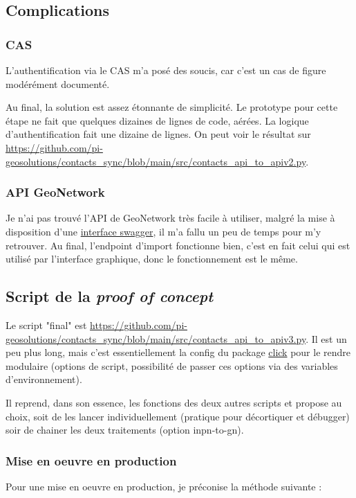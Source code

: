 \documentclass[11pt, a4paper, oneside]{book}
\newcommand{\gn}{GeoNetwork\xspace}
\begin{document}
\subsection*{Complications}
\subsubsection*{CAS}
L'authentification via le CAS m'a posé des soucis, car c'est un cas de figure modérément documenté.

Au final, la solution est assez étonnante de simplicité. Le prototype pour cette étape ne fait que quelques dizaines de lignes de code, aérées. La logique d'authentification fait une dizaine de lignes. On peut voir le résultat sur \url{https://github.com/pi-geosolutions/contacts_sync/blob/main/src/contacts_api_to_apiv2.py}.

\subsubsection*{API \gn}
Je n'ai pas trouvé l'API de \gn très facile à utiliser, malgré la mise à disposition d'une \href{https://sib1.dev.pigeosolutions.fr/geonetwork/doc/api/index.html#/}{interface swagger}, il m'a fallu un peu de temps pour m'y retrouver. Au final, l'endpoint d'import fonctionne bien, c'est en fait celui qui est utilisé par l'interface graphique, donc le fonctionnement est le même.

\subsection*{Script de la \textit{proof of concept}}
Le script "final" est \url{https://github.com/pi-geosolutions/contacts_sync/blob/main/src/contacts_api_to_apiv3.py}. Il est un peu plus long, mais c'est essentiellement la config du package \href{https://click.palletsprojects.com/en/8.1.x}{click} pour le rendre modulaire (options de script, possibilité de passer ces options via des variables d'environnement). 

Il reprend, dans son essence, les fonctions des deux autres scripts et propose au choix, soit de les lancer individuellement (pratique pour décortiquer et débugger) soir de chainer les deux traitements (option inpn-to-gn).

\subsubsection*{Mise en oeuvre en production}
Pour une mise en oeuvre en production, je préconise la méthode suivante : 
\end{document}
